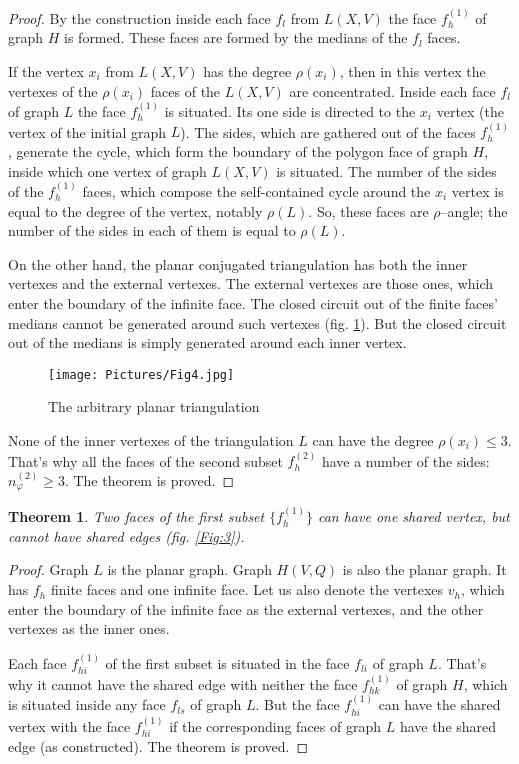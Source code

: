 \documentclass{amsart}
\newtheorem{theorem}{Theorem}
\theoremstyle{plain}
\numberwithin{equation}{section}
\begin{document}
\begin {proof}
By the construction inside each face $f_l$ from $L(X,V)$ the face $f_h^{(1)}$ of graph $H$ is formed. These faces are formed by the medians of the $f_l$ faces.

If the vertex $x_i$ from $L(X,V)$ has the degree $\rho(x_i)$, then in this vertex the vertexes of the $\rho(x_i)$ faces of the $L(X,V)$ are concentrated. Inside each face $f_l$ of graph $L$ the face $f_h^{(1)}$ is situated. Its one side is directed to the $x_i$ vertex (the vertex of the initial graph $L$). The sides, which are gathered out of the faces $f_h^{(1)}$, generate the cycle, which form the boundary of the polygon face of graph $H$, inside which one vertex of graph $L(X,V)$ is situated. The number of the sides of the $f_h^{(1)}$ faces, which compose the self-contained cycle around the $x_i$ vertex is equal to the degree of the vertex, notably $\rho(L)$. So, these faces are $\rho$--angle; the number of the sides in each of them is equal to $\rho(L)$.

On the other hand, the planar conjugated triangulation has both the inner vertexes and the external vertexes. The external vertexes are those ones, which enter the boundary of the infinite face. The closed circuit out of the finite faces' medians cannot be generated around such vertexes (fig. \ref{Fig:4}). But the closed circuit out of the medians is simply generated around each inner vertex.

\begin{figure}[htp]
		\texttt{[image: Pictures/Fig4.jpg]}
	\caption{The arbitrary planar triangulation}
	\label{Fig:4}
\end{figure}

None of the inner vertexes of the triangulation $L$ can have the degree $\rho(x_i) \le 3$. That's why all the faces of the second subset $f_h^{(2)}$ have a number of the sides: $n_{\varphi}^{(2)} \ge 3$. The theorem is proved.
\end {proof}

\begin{theorem}
Two faces of the first subset $\{f_h^{(1)}\}$ can have one shared vertex, but cannot have shared edges (fig. \ref{Fig:3}).
\end {theorem}

\begin {proof}
Graph $L$ is the planar graph. Graph $H(V,Q)$ is also the planar graph. It has $f_h$ finite faces and one infinite face. Let us also denote the vertexes $v_h$, which enter the boundary of the infinite face as the external vertexes, and the other vertexes   as the inner ones.

Each face $f_{hi}^{(1)}$ of the first subset is situated in the face $f_{li}$ of graph $L$. That's why it cannot have the shared edge with neither the face $f_{hk}^{(1)}$ of graph $H$, which is situated inside any face $f_{ls}$ of graph $L$. But the face $f_{hi}^{(1)}$ can have the shared vertex with the face $f_{hi}^{(1)}$ if the corresponding faces of graph $L$ have the shared edge (as constructed). The theorem is proved.
\end {proof}
\end{document}

